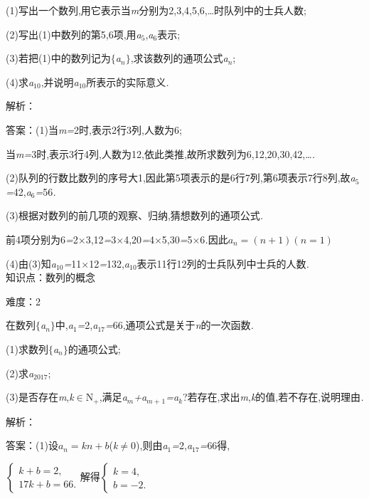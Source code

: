 \documentclass{article} %
\begin{document}
 

 (1)写出一个数列,用它表示当\textit{m}分别为2,3,4,5,6,{\dots}时队列中的士兵人数;

 (2)写出(1)中数列的第5,6项,用\textit{a}${}_{5}$,\textit{a}${}_{6}$表示;

 (3)若把(1)中的数列记为$\mathrm{\{}$\textit{a${}_{n}$}$\mathrm{\}}$,求该数列的通项公式\textit{a${}_{n}$};

 (4)求\textit{a}${}_{10}$,并说明\textit{a}${}_{10}$所表示的实际意义\textit{.}

 

解析：

 答案：(1)当\textit{m=}2时,表示2行3列,人数为6;

当\textit{m=}3时,表示3行4列,人数为12,依此类推,故所求数列为6,12,20,30,42,{\dots}\textit{.}

(2)队列的行数比数列的序号大1,因此第5项表示的是6行7列,第6项表示7行8列,故\textit{a}${}_{5}$\textit{=}42,\textit{a}${}_{6}$\textit{=}56\textit{.}

(3)根据对数列的前几项的观察、归纳,猜想数列的通项公式\textit{.}

前4项分别为6\textit{=}2\textit{$\times$}3,12\textit{=}3\textit{$\times$}4,20\textit{=}4\textit{$\times$}5,30\textit{=}5\textit{$\times$}6\textit{.}因此$a_n=(n+1)(n=1)$

(4)由(3)知\textit{a}${}_{10}$\textit{=}11\textit{$\times$}12\textit{=}132,\textit{a}${}_{10}$表示11行12列的士兵队列中士兵的人数\textit{.} \\

知识点：数列的概念

难度：2

 在数列$\mathrm{\{}$\textit{a${}_{n}$}$\mathrm{\}}$中,\textit{a}${}_{1}$\textit{=}2,\textit{a}${}_{17}$\textit{=}66,通项公式是关于\textit{n}的一次函数\textit{.}

 (1)求数列$\mathrm{\{}$\textit{a${}_{n}$}$\mathrm{\}}$的通项公式;

 (2)求\textit{a}${}_{2017}$;

 (3)是否存在\textit{m},\textit{k}$\mathrm{\in}$N${}_{+}$,满足\textit{a${}_{m}$+a${}_{m+}$}${}_{1}$\textit{=a${}_{k}$}?若存在,求出\textit{m},\textit{k}的值,若不存在,说明理由\textit{.}

解析：

 答案：(1)设$a_n=kn+b$(\textit{k}$\mathrm{\neq}$0),则由\textit{a}${}_{1}$\textit{=}2,\textit{a}${}_{17}$\textit{=}66得,

$\left\{
\begin{array}{l}
k+b=2, \\
17k+b=66.
\end{array}
\right.$解得$\left\{
\begin{array}{l}
k=4, \\
b=-2.
\end{array}
\right.$
\end{document}
